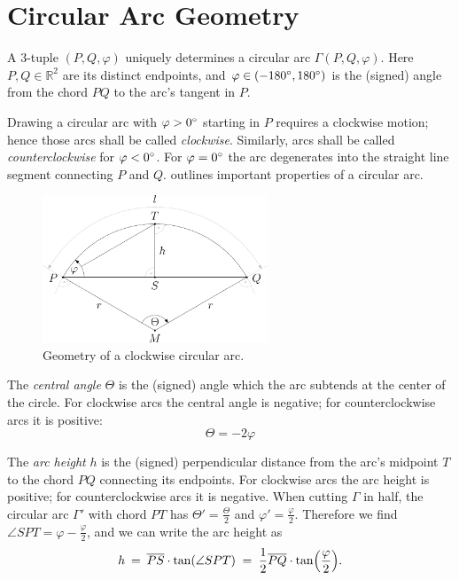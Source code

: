 \section{Circular Arc Geometry}
\label{sect:circular-arc-geometry}

A 3-tuple ${(P, Q, \varphi)}$ uniquely determines a circular arc ${\Gamma(P, Q, \varphi)}$. Here ${P, Q \in \mathbb{R}^2}$ are its distinct endpoints, and ${\varphi \in (-180^{\circ}, 180^{\circ})}$ is the (signed) angle from the chord ${PQ}$ to the arc's tangent in ${P}$.

Drawing a circular arc with ${\varphi > 0 ^{\circ}}$ starting in ${P}$ requires a clockwise motion; hence those arcs shall be called \emph{clockwise}. Similarly, arcs shall be called \emph{counterclockwise} for ${\varphi < 0 ^{\circ}}$. For ${\varphi = 0 ^{\circ}}$ the arc degenerates into the straight line segment connecting ${P}$ and ${Q}$.  outlines important properties of a circular arc.
%
\begin{figure}[H]
  \centering\includegraphics[width=0.6\textwidth]{Resources/Figures/Clockwise-Circular-Arc.pdf}
  \caption{Geometry of a clockwise circular arc.}
  \label{fig:circular-arc-geometry}
\end{figure}



\noindent
The \emph{central angle} ${\Theta}$ is the (signed) angle which the arc subtends at the center of the circle. For clockwise arcs the central angle is negative; for counterclockwise arcs it is positive:
%
\begin{equation*}
  \Theta = -2 \varphi
\end{equation*}



\noindent
The \emph{arc height} ${h}$ is the (signed) perpendicular distance from the arc's midpoint ${T}$ to the chord ${PQ}$ connecting its endpoints. For clockwise arcs the arc height is positive; for counterclockwise arcs it is negative. When cutting ${\Gamma}$ in half, the circular arc ${\Gamma'}$ with chord ${PT}$ has ${\Theta' = \frac{\Theta}{2}}$ and ${\varphi' = \frac{\varphi}{2}}$. Therefore we find ${\angle SPT = \varphi - \frac{\varphi}{2}}$, and we can write the arc height as
%
\begin{equation*}
  h \: = \: \overline{PS} \cdot {\tan}{\left({\angle SPT}\right)} \; = \; \frac{1}{2} \overline{PQ} \cdot {\tan}{\left({\frac{\varphi}{2}}\right)}.
\end{equation*}



